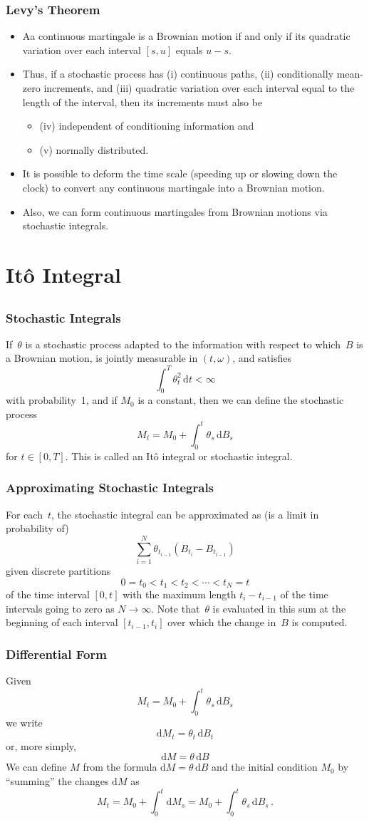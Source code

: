 \documentclass[10pt]{beamer}
\newcommand{\bi}{\begin{itemize}}
\newcommand{\ei}{\end{itemize}}
\newcommand{\im}{\item}
\newcommand{\D}{\mathrm{d}}
\newcommand{\bfr}{\begin{frame}}
\begin{document}
\bfr\frametitle{Levy's Theorem}
\bi
\im Aa continuous martingale is a Brownian motion if and only if its quadratic variation over each interval $[s,u]$ equals $u-s$.
\im Thus, if a stochastic process has (i) continuous paths, (ii) conditionally mean-zero increments, and (iii) quadratic variation over each interval equal to the length of the interval, then its increments must also be \bi
\im (iv) independent of conditioning information and 
\im (v) normally distributed.
\ei
\im It is possible to deform the time scale (speeding up or slowing down the clock) to convert any continuous martingale into a Brownian motion.
\im Also, we can form continuous martingales from Brownian motions via stochastic integrals.
\ei
\end{frame}

\section{It\^o Integral}
\subsection{}

\bfr\frametitle{Stochastic Integrals}
If~$\theta$ is a stochastic process adapted to the information with respect to which~$B$ is a Brownian motion, is jointly measurable in $(t,\omega)$, and satisfies
$$
\int_0^T \theta_t^2\,\D t < \infty
$$
with probability~1, and if $M_0$ is a constant,
then we can define the stochastic process
$$
M_t = M_0+\int_0^t \theta_s\,\D B_s
$$
for $t \in [0,T]$.  This is called an It\^o integral  or stochastic integral.

\end{frame}

\bfr\frametitle{Approximating Stochastic Integrals}
For each~$t$, the stochastic integral can be approximated as (is a limit in probability of)
$$
\sum_{i=1}^N \theta_{t_{i-1}}(B_{t_i}-B_{t_{i-1}})
$$
given  discrete partitions
$$0=t_0 < t_1 < t_2 < \cdots < t_N=t$$
of the time interval $[0,t]$ with the maximum length $t_i-t_{i-1}$ of the time intervals going to zero as $N \rightarrow \infty$.   Note that~$\theta$ is evaluated in this sum at the beginning of each interval $[t_{i-1},t_i]$ over which the change in~$B$ is computed.
\end{frame}

\bfr\frametitle{Differential Form}
Given 
$$
M_t = M_0+\int_0^t \theta_s\,\D B_s
$$
 we write
$$
\D M_t = \theta_t\,\D B_t
$$ or, more simply, 
$$\D M = \theta\,\D B$$ 
We can define $M$ from the formula $\D M = \theta\,\D B$ and the initial condition $M_0$  by ``summing'' the changes $\D M$ as
$$M_t = M_0 + \int_0^t \D M_s =  M_0+\int_0^t \theta_s\,\D B_s\,.$$
\end{frame}
\end{document}
